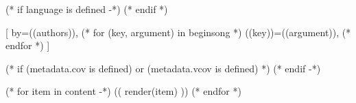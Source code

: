 

(* if language is defined -*)
(* endif *)

[
  by={((authors))},
  (* for (key, argument) in beginsong *)
  ((key))={((argument))},
  (* endfor *)
]

(* if (metadata.cov is defined) or (metadata.vcov is defined) *)
\cover
(* endif -*)

(* for item in content -*)
    (( render(item) ))
(* endfor *)

\endsong

